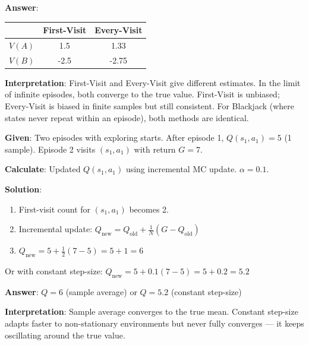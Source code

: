 \documentclass[11pt,a4paper]{article}
\begin{document}
\begin{tcolorbox}[colback=blue!5!white,colframe=blue!75!black,title=\textbf{Worked Example 28: First-Visit vs Every-Visit MC}]
\textbf{Answer}:
\begin{center}
\begin{tabular}{|c|c|c|}
\hline
& First-Visit & Every-Visit \\ \hline
$V(A)$ & 1.5 & 1.33 \\ \hline
$V(B)$ & -2.5 & -2.75 \\ \hline
\end{tabular}
\end{center}

\textbf{Interpretation}: First-Visit and Every-Visit give different estimates. In the limit of infinite episodes, both converge to the true value. First-Visit is unbiased; Every-Visit is biased in finite samples but still consistent. For Blackjack (where states never repeat within an episode), both methods are identical.
\end{tcolorbox}

\begin{tcolorbox}[colback=green!5!white,colframe=green!75!black,title=\textbf{Worked Example 29: Monte Carlo Control}]
\textbf{Given}: Two episodes with exploring starts. After episode 1, $Q(s_1, a_1) = 5$ (1 sample). Episode 2 visits $(s_1, a_1)$ with return $G = 7$.

\textbf{Calculate}: Updated $Q(s_1, a_1)$ using incremental MC update. $\alpha = 0.1$.

\textbf{Solution}:
\begin{enumerate}
    \item First-visit count for $(s_1, a_1)$ becomes 2.
    \item Incremental update: $Q_{\text{new}} = Q_{\text{old}} + \frac{1}{N}(G - Q_{\text{old}})$
    \item $Q_{\text{new}} = 5 + \frac{1}{2}(7 - 5) = 5 + 1 = 6$
\end{enumerate}

Or with constant step-size: $Q_{\text{new}} = 5 + 0.1(7 - 5) = 5 + 0.2 = 5.2$

\textbf{Answer}: $Q = 6$ (sample average) or $Q = 5.2$ (constant step-size)

\textbf{Interpretation}: Sample average converges to the true mean. Constant step-size adapts faster to non-stationary environments but never fully converges --- it keeps oscillating around the true value.
\end{tcolorbox}
\end{document}
